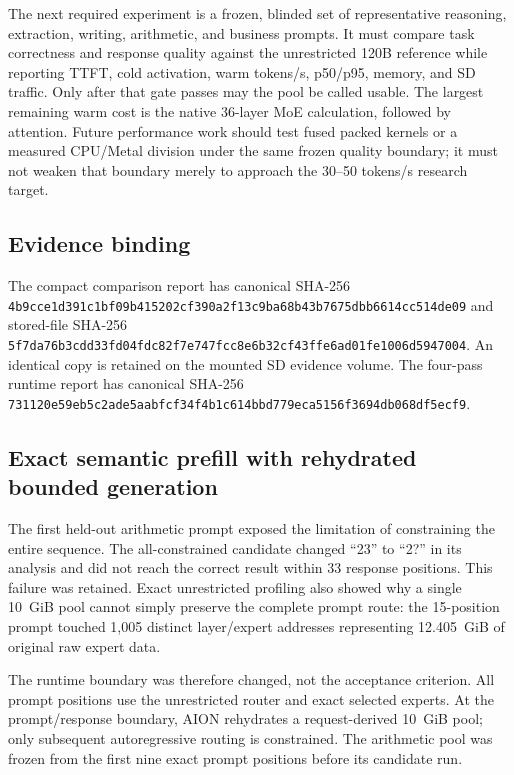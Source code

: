 The next required experiment is a frozen, blinded set of representative
reasoning, extraction, writing, arithmetic, and business prompts.  It must
compare task correctness and response quality against the unrestricted 120B
reference while reporting TTFT, cold activation, warm tokens/s, p50/p95, memory,
and SD traffic.  Only after that gate passes may the pool be called usable.  The
largest remaining warm cost is the native 36-layer MoE calculation, followed by
attention.  Future performance work should test fused packed kernels or a
measured CPU/Metal division under the same frozen quality boundary; it must not
weaken that boundary merely to approach the 30--50 tokens/s research target.

\subsection{Evidence binding}

The compact comparison report has canonical SHA-256
\texttt{4b9cce1d391c1bf09b415202cf390a2f13c9ba68b43b7675dbb6614cc514de09}
and stored-file SHA-256
\texttt{5f7da76b3cdd33fd04fdc82f7e747fcc8e6b32cf43ffe6ad01fe1006d5947004}.
An identical copy is retained on the mounted SD evidence volume.  The four-pass
runtime report has canonical SHA-256
\texttt{731120e59eb5c2ade5aabfcf34f4b1c614bbd779eca5156f3694db068df5ecf9}.

\subsection{Exact semantic prefill with rehydrated bounded generation}

The first held-out arithmetic prompt exposed the limitation of constraining the
entire sequence.  The all-constrained candidate changed ``23'' to ``2?'' in its
analysis and did not reach the correct result within 33 response positions.
This failure was retained.  Exact unrestricted profiling also showed why a
single 10~GiB pool cannot simply preserve the complete prompt route: the
15-position prompt touched 1,005 distinct layer/expert addresses representing
12.405~GiB of original raw expert data.

The runtime boundary was therefore changed, not the acceptance criterion.  All
prompt positions use the unrestricted router and exact selected experts.  At
the prompt/response boundary, AION rehydrates a request-derived 10~GiB pool;
only subsequent autoregressive routing is constrained.  The arithmetic pool
was frozen from the first nine exact prompt positions before its candidate run.

